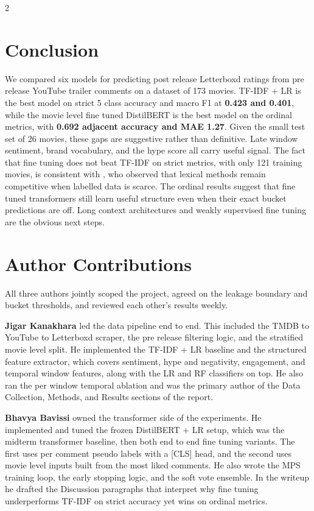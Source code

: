 \documentclass[10pt,letterpaper]{article}
\begin{document}
\begin{multicols}{2}
\section{Conclusion}
\noindent We compared six models for predicting post release Letterboxd ratings from pre release YouTube trailer comments on a dataset of 173 movies. TF-IDF + LR is the best model on strict 5 class accuracy and macro F1 at \textbf{0.423 and 0.401}, while the movie level fine tuned DistilBERT is the best model on the ordinal metrics, with \textbf{0.692 adjacent accuracy and MAE 1.27}. Given the small test set of 26 movies, these gaps are suggestive rather than definitive. Late window sentiment, brand vocabulary, and the hype score all carry useful signal. The fact that fine tuning does not beat TF-IDF on strict metrics, with only 121 training movies, is consistent with \cite{pang2002}, who observed that lexical methods remain competitive when labelled data is scarce. The ordinal results suggest that fine tuned transformers still learn useful structure even when their exact bucket predictions are off. Long context architectures and weakly supervised fine tuning are the obvious next steps.

\section*{Author Contributions}
\noindent All three authors jointly scoped the project, agreed on the leakage boundary and bucket thresholds, and reviewed each other's results weekly.

\textbf{Jigar Kanakhara} led the data pipeline end to end. This included the TMDB to YouTube to Letterboxd scraper, the pre release filtering logic, and the stratified movie level split. He implemented the TF-IDF + LR baseline and the structured feature extractor, which covers sentiment, hype and negativity, engagement, and temporal window features, along with the LR and RF classifiers on top. He also ran the per window temporal ablation and was the primary author of the Data Collection, Methods, and Results sections of the report.

\textbf{Bhavya Bavissi} owned the transformer side of the experiments. He implemented and tuned the frozen DistilBERT + LR setup, which was the midterm transformer baseline, then both end to end fine tuning variants. The first uses per comment pseudo labels with a [CLS] head, and the second uses movie level inputs built from the most liked comments. He also wrote the MPS training loop, the early stopping logic, and the soft vote ensemble. In the writeup he drafted the Discussion paragraphs that interpret why fine tuning underperforms TF-IDF on strict accuracy yet wins on ordinal metrics.


\end{multicols}
\end{document}
